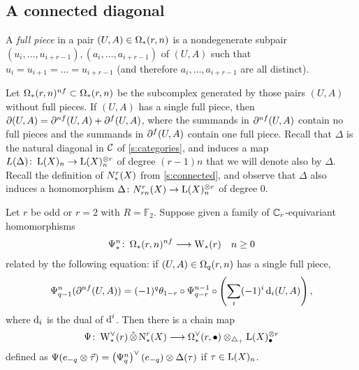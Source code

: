 \subsection{A connected diagonal}\label{s:mainresult} A \emph{full piece} in a pair $(U,A)\in \Om(r,n)$ is a nondegenerate subpair $(u_i,\dots,u_{i+r-1}),(a_i,\dots,a_{i+r-1})$ of $(U,A)$ such that $u_i = u_{i+1} = \dots = u_{i+r-1}$ (and therefore $a_i,\dots,a_{i+r-1}$ are all distinct).

Let $\Om(r,n)^{\nf} \subset \Om(r,n)$ be the subcomplex generated by those pairs $(U,A)$ without full pieces. If $(U,A)$ has a single full piece, then $\partial(U,A) = \partial^{\nf}(U,A) + \partial^{\f}(U,A)$, where the summands in $\partial^{\nf}(U,A)$ contain no full pieces and the summands in $\partial^{\f}(U,A)$ contain one full piece. Recall that $\Delta$ is the natural diagonal in $\cC$ of \ref{s:categories}, and induces a map $L(\Delta) \colon \rA(X)_n \to \rA(X)_n^{\ot r}$ of degree $(r-1)n$ that we will denote also by $\Delta$. Recall the definition of $\rcadenas(X)$ from \cref{s:connected}, and observe that $\Delta$ also induces a homomorphism $\Delta \colon \rcadenas[rn](X) \to \rA(X)_n^{\ot r}$ of degree $0$.

\renewcommand{\Psiom}{\Psi}

\begin{proposition}\label{prop:omegarm}
	Let $r$ be odd or $r=2$ with $R=\mathbb{F}_2$. Suppose given a family of $\Cyc_r$-equivariant homomorphisms
	\begin{align*}
		\Psiom_*^n \colon \Om(r,n)^{\nf}& \lra \rW(r) & n \geq 0
	\end{align*}
	related by the following equation: if $(U,A)\in \Om[q](r,n)$ has a single full piece,
	\begin{equation}
		 \label{it:1a}
		\Psiom^n_{q-1}(\partial^{\nf} (U,A)) = (-1)^q\theta_{1-r}\circ \Psiom^{n-1}_{q-r}\circ \left(\sum_i (-1)^i \d_i(U,A)\right),
	\end{equation}
	where $\d_i$ is the dual of $\d^i$. Then there is a chain map
	\[
	\Psi \colon \rWd(r) \hotimes \rchains(X) \lra \Omd(r,\bullet) \ot_{\asimplex} \rA(X)_\bullet^{\ot r}
	\]
	defined as $\Psi(e_{-q} \ot \vec{\tau}) = \left(\Psiom^n_q\right)^\vee(e_{-q}) \ot \Delta(\tau)$ if $\tau\in \rA(X)_{n}$.
\end{proposition}
\def\diaglin{\Delta}


